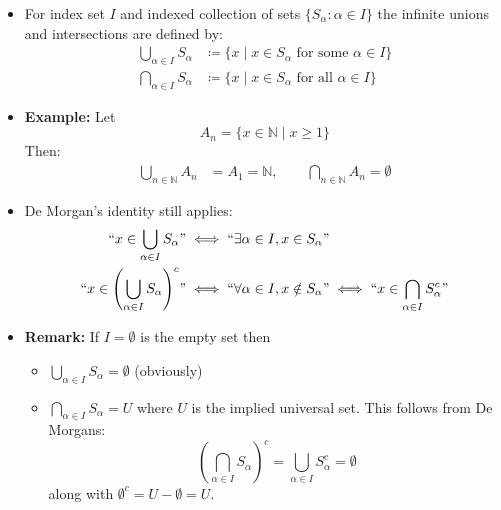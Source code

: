 \documentclass[11pt,twoside]{report}
\newcommand{\bbN}{{\mathbb{N}}}
\begin{document}
\begin{itemize}
\item  For index set $I$ and indexed collection of sets $\{S_\alpha : \alpha \in I\}$ the infinite unions and intersections are defined by:
  \begin{align*}
  \bigcup_{\alpha \in I} S_{\alpha}
  &\coloneqq \{ x\mid x \in S_{\alpha} \text{ for some } \alpha \in I \} \\
  \bigcap_{\alpha \in I} S_{\alpha}
  &\coloneqq \{ x \mid x \in S_{\alpha} \text{ for all } \alpha \in I \} 
  \end{align*}  
  

\item \textbf{Example:} Let
\[
A_n = \{ x \in \bbN \mid x \ge 1\} 
\]
Then:
  \begin{align*}
  \bigcup_{n \in \bbN } A_{n} & = A_1 = \bbN, \qquad 
  \bigcap_{n \in \bbN } A_n     = \emptyset
  \end{align*}  
  
  
\item  De Morgan's identity still applies:
  \begin{align*}
  ``x \in \bigcup_{\alpha \in I} S_{\alpha}" &\iff  ``\exists \alpha \in I, x\in S_\alpha" \\
  ``x \in \left(\bigcup_{\alpha \in I} S_{\alpha}\right)^c" &\iff  ``\forall \alpha \in I, x \notin S_\alpha" \iff  ``x \in \bigcap_{\alpha \in I} S^c_{\alpha}"
  \end{align*}  
  

\item \textbf{Remark:}  If $I = \emptyset$ is the empty set then
\begin{itemize}
\item $\displaystyle \bigcup_{\alpha \in I} S_\alpha = \emptyset$  (obviously) 
\item $\displaystyle \bigcap_{\alpha \in I} S_\alpha =  U$   where $U$ is the implied universal set. This follows from De Morgans:
\[
\left( \displaystyle \bigcap_{\alpha \in I} S_\alpha \right)^c =  \displaystyle \bigcup_{\alpha \in I} S^c_\alpha = \emptyset
\]
along with $\emptyset^c = U - \emptyset = U$. 
\end{itemize} 


\end{itemize}
\end{document}

